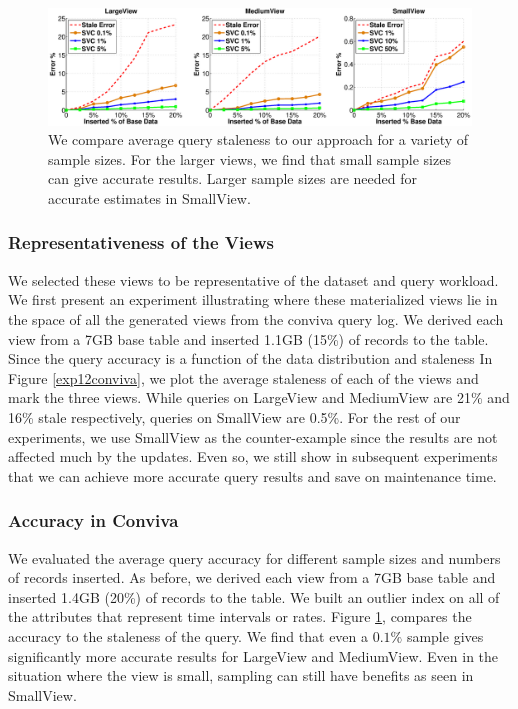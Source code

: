 \begin{figure}[t]
\includegraphics[trim = 45mm 0mm 45mm 0mm, clip,width=\columnwidth]{exp/exp5-coniva-accuracy.eps}
 \caption{We compare average query staleness to our approach for a variety of sample sizes. For the larger views, we find that small sample sizes can give accurate results. Larger sample sizes are needed for accurate estimates in SmallView. \label{exp5conviva}}
\end{figure}



\subsubsection{Representativeness of the Views}
We selected these views to be representative of the dataset and query workload. 
We first present an experiment illustrating where these materialized views lie in the space of all the generated views from the conviva query log. 
We derived each view from a 7GB base table and inserted 1.1GB (15\%) of records to the table. 
Since the query accuracy is a function of the data distribution and staleness
In Figure \ref{exp12conviva}, we plot the average staleness of each of the views and mark the three views.
While queries on LargeView and MediumView are 21\% and 16\% stale respectively, queries on SmallView are 0.5\%.
For the rest of our experiments, we use SmallView as the counter-example since the results are not affected much by the updates.
Even so, we still show in subsequent experiments that we can achieve more accurate query results and save on maintenance time.

\subsubsection{Accuracy in Conviva}
We evaluated the average query accuracy for different sample sizes and numbers of records inserted.
As before, we derived each view from a 7GB base table and inserted 1.4GB (20\%) of records to the table. 
We built an outlier index on all of the attributes that represent time intervals or rates.
Figure \ref{exp5conviva}, compares the accuracy to the staleness of the query.
We find that even a $0.1\%$ sample gives significantly more accurate results for LargeView and MediumView.
Even in the situation where the view is small, sampling can still have benefits as seen in SmallView.

